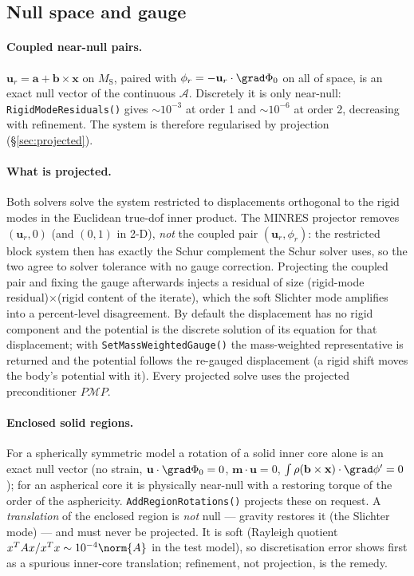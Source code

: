 \documentclass[11pt]{article}
\numberwithin{equation}{section}
\theoremstyle{remark}
\newcommand{\vu}{\mathbf{u}}
\newcommand{\vm}{\mathbf{m}}
\newcommand{\vx}{\mathbf{x}}
\newcommand{\MS}{M_{\mathrm{S}}}
\newcommand{\code}[1]{\texttt{#1}}
\begin{document}
\subsection{Null space and gauge}
\label{sec:mixed-null}

\paragraph{Coupled near-null pairs.} $\vu_r = \mathbf{a} + \mathbf{b}\times
\vx$ on $\MS$, paired with $\phi_r = -\vu_r\cdot\grad\Phi_0$ on all of space,
is an exact null vector of the continuous $\mathcal{A}$. Discretely it is
only near-null: \code{RigidModeResiduals()} gives $\sim10^{-3}$ at order 1
and $\sim10^{-6}$ at order 2, decreasing with refinement. The system is
therefore regularised by projection (\S\ref{sec:projected}).

\paragraph{What is projected.} Both solvers solve the system restricted to
displacements orthogonal to the rigid modes in the Euclidean true-dof inner
product. The MINRES projector removes $(\vu_r, 0)$ (and $(0,1)$ in 2-D),
\emph{not} the coupled pair $(\vu_r,\phi_r)$: the restricted block system
then has exactly the Schur complement the Schur solver uses, so the two
agree to solver tolerance with no gauge correction. Projecting the coupled
pair and fixing the gauge afterwards injects a residual of size
(rigid-mode residual)$\times$(rigid content of the iterate), which the soft
Slichter mode amplifies into a percent-level disagreement. By default the
displacement has no rigid component and the potential is the discrete
solution of its equation for that displacement; with
\code{SetMassWeightedGauge()} the mass-weighted representative is returned
and the potential follows the re-gauged displacement (a rigid shift moves
the body's potential with it). Every projected solve uses the projected
preconditioner $P\mathcal{M}P$.

\paragraph{Enclosed solid regions.} For a spherically symmetric model a
rotation of a solid inner core alone is an exact null vector (no strain,
$\vu\cdot\grad\Phi_0 = 0$, $\vm\cdot\vu = 0$, $\int\rho(\mathbf{b}\times\vx)
\cdot\grad\phi' = 0$); for an aspherical core it is physically near-null
with a restoring torque of the order of the asphericity.
\code{AddRegionRotations()} projects these on request. A
\emph{translation} of the enclosed region is \emph{not} null --- gravity
restores it (the Slichter mode) --- and must never be projected. It is soft
(Rayleigh quotient $x^TAx/x^Tx\sim10^{-4}\norm{A}$ in the test model), so
discretisation error shows first as a spurious inner-core translation;
refinement, not projection, is the remedy.
\end{document}
